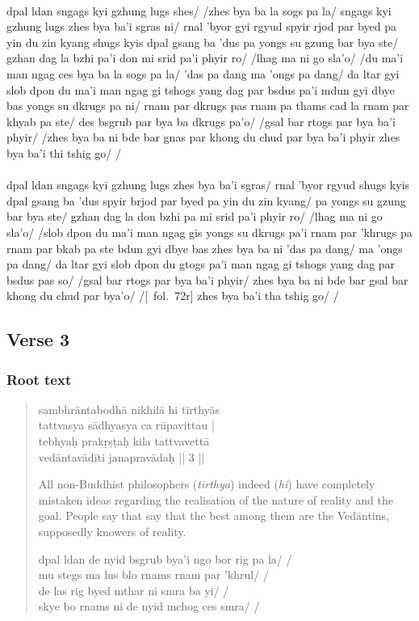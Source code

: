 \documentclass[12pt]{article}
\begin{document}
\textbf{\TVA}\\
dpal ldan sngags kyi gzhung lugs shes/ /zhes bya ba la sogs pa la/ sngags kyi gzhung lugs zhes bya ba'i sgras ni/ rnal 'byor gyi rgyud spyir rjod par byed pa yin du zin kyang shugs kyis dpal gsang ba 'dus pa yongs su gzung bar bya ste/ gzhan dag la bzhi pa'i don mi srid pa'i phyir ro/ /lhag ma ni go sla'o/ /du ma'i man ngag ces bya ba la sogs pa la/ 'das pa dang ma 'ongs pa dang/ da ltar gyi slob dpon du ma'i man ngag gi tshogs yang dag par bsdus pa'i mdun gyi dbye bas yongs su dkrugs pa ni/ rnam par dkrugs pas rnam pa thams cad la rnam par khyab pa ste/ des bsgrub par bya ba dkrugs pa'o/ /gsal bar rtogs par bya ba'i phyir/ /zhes bya ba ni bde bar gnas par khong du chud par bya ba'i phyir zhes bya ba'i thi tshig go/ /\\

\textbf{\TVB}\\
dpal ldan sngags kyi gzhung lugs zhes bya ba'i sgras/ rnal 'byor rgyud shugs kyis dpal gsang ba 'dus spyir brjod par byed pa yin du zin kyang/ pa yongs su gzung bar bya ste/ gzhan dag la don bzhi pa mi srid pa'i phyir ro/ /lhag ma ni go sla'o/ /slob dpon du ma'i man ngag gis yongs su dkrugs pa'i rnam par 'khrugs pa rnam par bkab pa ste bdun gyi dbye bas zhes bya ba ni 'das pa dang/ ma 'ongs pa dang/ da ltar gyi slob dpon du gtogs pa'i man ngag gi tshogs yang dag par bsdus pas so/ /gsal bar rtogs par bya ba'i phyir/ zhes bya ba ni bde bar gsal bar khong du chud par bya'o/ /[\TVB\ fol.\ 72r] zhes bya ba'i tha tshig go/ /

\subsection{Verse 3}
\subsubsection{Root text}
\begin{quote}
	sambhrāntabodhā nikhilā hi tīrthyās \\%
	tattvasya sādhyasya ca rūpavittau |\\
	tebhyaḥ prakṛṣṭaḥ kila tattvavettā\\
	vedāntavādīti janapravādaḥ || 3 ||

	All non-Buddhist philosophers (\emph{tīrthya}) indeed (\emph{hi}) have completely mistaken ideas regarding the realisation of the nature of reality and the goal.
	People say that say that the best among them are the Vedāntins, supposedly knowers of reality.

	dpal ldan de nyid bsgrub bya'i ngo bor rig pa la/ /\\
	mu stegs ma lus blo rnams rnam par 'khrul/ /\\
	de las rig byed mthar ni smra ba yi/ /\\
	skye bo rnams ni de nyid mchog ces smra/ /
\end{quote}
\end{document}
